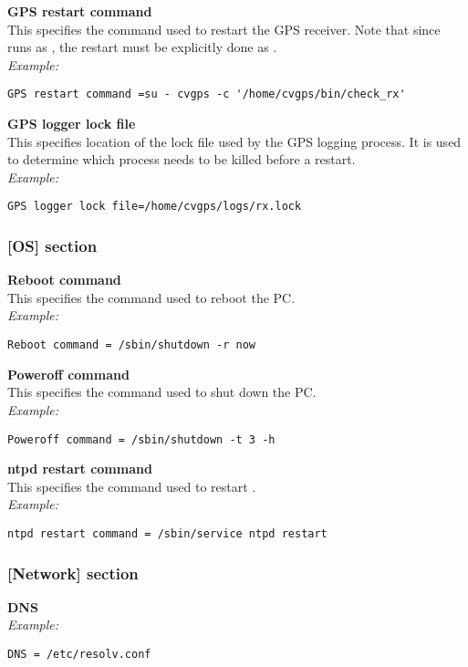 {\bfseries GPS restart command}\\
This specifies the command used to restart the GPS receiver. Note that since
 runs as , the restart must be explicitly done
as .\\
\textit{Example:}
\begin{lstlisting}
GPS restart command =su - cvgps -c '/home/cvgps/bin/check_rx'
\end{lstlisting}

{\bfseries GPS logger lock file}\\
This specifies location of the lock file used by the GPS logging process. It is
used to determine which process needs to be killed before a restart.\\
\textit{Example:}
\begin{lstlisting}
GPS logger lock file=/home/cvgps/logs/rx.lock
\end{lstlisting}

\subsubsection{[OS] section}
{\bfseries Reboot command}\\
This specifies the command used to reboot the PC.\\
\textit{Example:}
\begin{lstlisting}
Reboot command = /sbin/shutdown -r now
\end{lstlisting}

{\bfseries Poweroff command}\\
This specifies the command used to shut down the PC.\\
\textit{Example:}
\begin{lstlisting}
Poweroff command = /sbin/shutdown -t 3 -h
\end{lstlisting}

{\bfseries ntpd restart command}\\
This specifies the command used to restart .\\
\textit{Example:}
\begin{lstlisting}
ntpd restart command = /sbin/service ntpd restart
\end{lstlisting}

\subsubsection{[Network] section}
{\bfseries DNS}\\
\textit{Example:}
\begin{lstlisting}
DNS = /etc/resolv.conf
\end{lstlisting}

